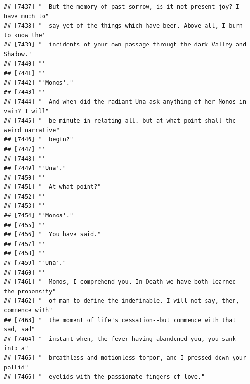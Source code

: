\documentclass{article}\usepackage[]{graphicx}\usepackage[]{color}
\makeatletter
\newenvironment{kframe}{%
 \def\at@end@of@kframe{}%
 \ifinner\ifhmode%
  \def\at@end@of@kframe{\end{minipage}}%
  \begin{minipage}{\columnwidth}%
 \fi\fi%
 \def\FrameCommand##1{\hskip\@totalleftmargin \hskip-\fboxsep
 \colorbox{shadecolor}{##1}\hskip-\fboxsep
     \hskip-\linewidth \hskip-\@totalleftmargin \hskip\columnwidth}%
 \MakeFramed {\advance\hsize-\width
   \@totalleftmargin\z@ \linewidth\hsize
   \@setminipage}}%
 {\par\unskip\endMakeFramed%
 \at@end@of@kframe}
\newenvironment{knitrout}{}{} %
\makeatother
\begin{document}
\begin{knitrout}
\begin{kframe}
\begin{verbatim}
## [7437] "  But the memory of past sorrow, is it not present joy? I have much to"      
## [7438] "  say yet of the things which have been. Above all, I burn to know the"      
## [7439] "  incidents of your own passage through the dark Valley and Shadow."         
## [7440] ""                                                                            
## [7441] ""                                                                            
## [7442] "'Monos'."                                                                    
## [7443] ""                                                                            
## [7444] "  And when did the radiant Una ask anything of her Monos in vain? I will"    
## [7445] "  be minute in relating all, but at what point shall the weird narrative"    
## [7446] "  begin?"                                                                    
## [7447] ""                                                                            
## [7448] ""                                                                            
## [7449] "'Una'."                                                                      
## [7450] ""                                                                            
## [7451] "  At what point?"                                                            
## [7452] ""                                                                            
## [7453] ""                                                                            
## [7454] "'Monos'."                                                                    
## [7455] ""                                                                            
## [7456] "  You have said."                                                            
## [7457] ""                                                                            
## [7458] ""                                                                            
## [7459] "'Una'."                                                                      
## [7460] ""                                                                            
## [7461] "  Monos, I comprehend you. In Death we have both learned the propensity"     
## [7462] "  of man to define the indefinable. I will not say, then, commence with"     
## [7463] "  the moment of life's cessation--but commence with that sad, sad"           
## [7464] "  instant when, the fever having abandoned you, you sank into a"             
## [7465] "  breathless and motionless torpor, and I pressed down your pallid"          
## [7466] "  eyelids with the passionate fingers of love."                              

\end{verbatim}
\end{kframe}
\end{knitrout}
\end{document}
